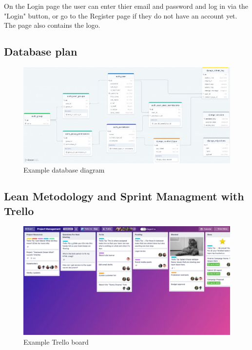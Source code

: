 \documentclass[12pt,a4paper]{article}
\begin{document}
\begin{spacing}{1.5}
    On the Login page the user can enter thier email and password and log in via
    the "Login" button, or go to the Register page if they do not have an account
    yet. The page also contains the logo. \newpage

    \subsection{Database plan}
    \begin{figure}[h]
        \centering
        \includegraphics[width=16cm]{assets/database-diagram-example.jpg}
        \caption{Example database diagram}
        \label{fig:database-diagram}
    \end{figure}
    \FloatBarrier

    \subsection{Lean Metodology and Sprint Managment with Trello}\label{subseq:lean-and-trello}
    \begin{figure}[h]
        \centering
        \includegraphics[width=14cm]{assets/trello-board-example.png}
        \caption{Example Trello board}
        \label{fig:trello-board}
    \end{figure}
    \FloatBarrier


\end{spacing}
\end{document}
